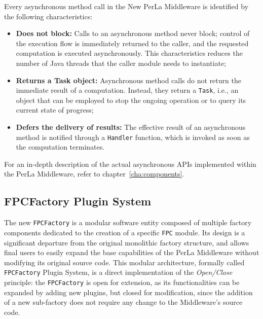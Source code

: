 Every asynchronous method call in the New PerLa Middleware is identified by the
following characteristics:

\begin{itemize}

    \item \textbf{Does not block:} Calls to an asynchronous method never block;
        control of the execution flow is immediately returned to the caller,
        and the requested computation is executed asynchronously. This
        characteristics reduces the number of Java threads that the caller
        module needs to instantiate;

    \item \textbf{Returns a Task object:} Asynchronous method calls do not
        return the immediate result of a computation. Instead, they return a
        \texttt{Task}, i.e., an object that can be employed to stop the ongoing
        operation or to query its current state of progress;

    \item \textbf{Defers the delivery of results:} The effective result of an
        asynchronous method is notified through a \texttt{Handler} function,
        which is invoked as soon as the computation terminates.

\end{itemize}

For an in-depth description of the actual asynchronous APIs implemented within
the PerLa Middleware, refer to chapter~\ref{cha:components}.


\subsection{FPCFactory Plugin System}
\label{sec:newmiddleware.factory}

The new \texttt{FPCFactory} is a modular software entity composed of multiple
factory components dedicated to the creation of a specific \texttt{FPC} module.
Its design is a significant departure from the original monolithic factory
structure, and allows final users to easily expand the base capabilities of the
PerLa Middleware without modifying its original source code. This modular
architecture, formally called \texttt{FPCFactory} Plugin System, is a direct
implementation of the \textit{Open/Close} principle: the \texttt{FPCFactory}
is open for extension, as its functionalities can be expanded by adding new
plugins, but closed for modification, since the addition of a new sub-factory
does not require any change to the Middleware's source code.

